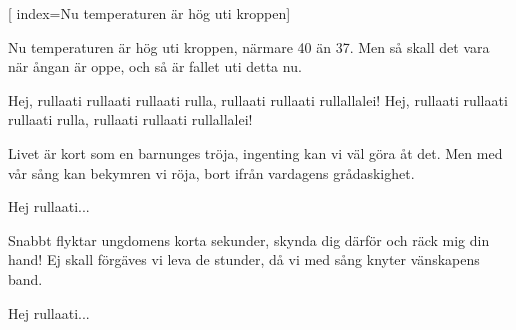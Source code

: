 [ 						
	index={Nu temperaturen är hög uti kroppen}]		
	
\beginverse*						
Nu temperaturen är hög uti kroppen, 
närmare 40 än 37.
 Men så skall det vara när ångan är oppe, 
och så är fallet uti detta nu. 
\endverse

\beginchorus				
Hej, rullaati rullaati rullaati rulla,
rullaati rullaati rullallalei! 
Hej, rullaati rullaati rullaati rulla,
rullaati rullaati rullallalei! 
\endchorus

\beginverse
Livet är kort som en barnunges tröja, 
ingenting kan vi väl göra åt det.
Men med vår sång kan bekymren vi röja, 
bort ifrån vardagens grådaskighet. 
\endverse	

\beginchorus
Hej rullaati...	
\endchorus

\beginverse
Snabbt flyktar ungdomens korta sekunder, 
skynda dig därför och räck mig din hand! 
Ej skall förgäves vi leva de stunder, 
då vi med sång knyter vänskapens band. 
\endverse	

\beginchorus
Hej rullaati...
\endchorus	
\endsong		